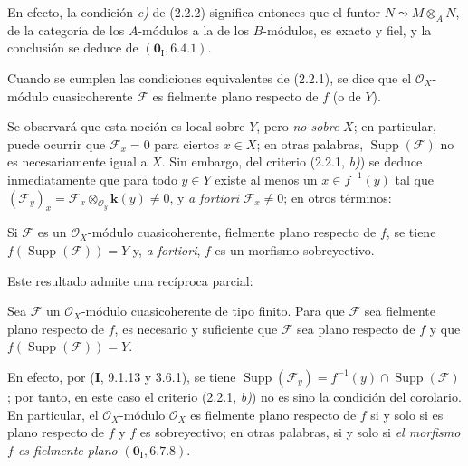 En efecto, la condición \emph{c)} de (2.2.2) significa entonces que el funtor
$N\leadsto M\otimes_A N$, de la categoría de los $A$-módulos a la de los
$B$-módulos, es exacto y fiel, y la conclusión se deduce de
$(\mathbf{0}_{\mathrm I},6.4.1)$.

\begin{definition}[2.2.4]
\label{IV.2.2.4-fr}
Cuando se cumplen las condiciones equivalentes de \textup{(2.2.1)}, se dice que el
$\mathcal O_X$-módulo cuasicoherente $\mathscr F$ es fielmente plano
respecto de $f$ (o de $Y$).
\end{definition}

Se observará que esta noción es local sobre $Y$, pero \emph{no sobre} $X$; en
particular, puede ocurrir que $\mathscr F_x=0$ para ciertos $x\in X$; en otras
palabras, $\operatorname{Supp}(\mathscr F)$ no es necesariamente igual a $X$.
Sin embargo, del criterio (2.2.1, \emph{b)}) se deduce inmediatamente que para
todo $y\in Y$ existe al menos un $x\in f^{-1}(y)$ tal que
$(\mathscr F_y)_x=\mathscr F_x\otimes_{\mathcal O_y}\boldsymbol{k}(y)\neq0$, y
\emph{a fortiori} $\mathscr F_x\neq0$; en otros términos:

\begin{corollary}[2.2.5]
\label{IV.2.2.5-fr}
Si $\mathscr F$ es un $\mathcal O_X$-módulo cuasicoherente, fielmente plano
respecto de $f$, se tiene $f(\operatorname{Supp}(\mathscr F))=Y$ y,
\emph{a fortiori}, $f$ es un morfismo sobreyectivo.
\end{corollary}

Este resultado admite una recíproca parcial:

\begin{corollary}[2.2.6]
\label{IV.2.2.6-fr}
Sea $\mathscr F$ un $\mathcal O_X$-módulo cuasicoherente de tipo finito. Para
que $\mathscr F$ sea fielmente plano respecto de $f$, es necesario y suficiente
que $\mathscr F$ sea plano respecto de $f$ y que
$f(\operatorname{Supp}(\mathscr F))=Y$.
\end{corollary}

En efecto, por (\textbf I, 9.1.13 y 3.6.1), se tiene
$\operatorname{Supp}(\mathscr F_y)=f^{-1}(y)\cap\operatorname{Supp}(\mathscr F)$;
por tanto, en este caso el criterio (2.2.1, \emph{b)}) no es sino la condición
del corolario. En particular, el $\mathcal O_X$-módulo $\mathcal O_X$ es
fielmente plano respecto de $f$ si y solo si es plano respecto de $f$ y $f$ es
sobreyectivo; en otras palabras, si y solo si \emph{el morfismo $f$ es
fielmente plano} $(\mathbf{0}_{\mathrm I},6.7.8)$.

